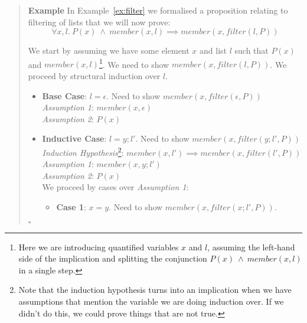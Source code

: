 \documentclass{tufte-handout}
\newcounter{example}
\newenvironment{example}
{\refstepcounter{example}\begin{quote}
\textbf{Example \arabic{example}}}
{

$\square$\end{quote}}
\begin{document}
\begin{example}\label{ex:filterproof}
  In Example~\ref{ex:filter} we formalised a proposition relating
  to filtering of lists that we will now prove:
  \[
    \forall x, l.~P(x) ~\land~ \mathit{member}(x, l)
    \implies
    \mathit{member}(x, \mathit{filter}(l, P))
  \]

  We start by assuming we have some element $x$ and list $l$ such
  that $P(x)$ and $\mathit{member}(x, l)$\footnote{Here we are
    introducing quantified variables $x$ and $l$, assuming the
    left-hand side of the implication and splitting the
    conjunction $P(x) ~\land~ \mathit{member}(x, l)$ in a single
    step.}. We need to show
  $\mathit{member}(x, \mathit{filter}(l, P))$. We proceed by
  structural induction over $l$.
  \begin{itemize}
  \item \textbf{Base Case}: $l = \epsilon$. Need to show $\mathit{member}(x, \mathit{filter}(\epsilon, P))$\\
    \textit{Assumption 1}: $\mathit{member}(x, \epsilon)$\\
    \textit{Assumption 2}: $P(x)$\\
  \item \textbf{Inductive Case}: $l = y; l'$. Need to show
    $\mathit{member}(x, \mathit{filter}(y; l', P))$\\
    \textit{Induction Hypothesis}\footnote{Note that the induction
      hypothesis turns into an implication when we have
      assumptions that mention the variable we are doing induction
      over. If we didn't do this, we could prove things that are
      not true. }:
    $\mathit{member}(x, l') \implies \mathit{member}(x,
    \mathit{filter}(l', P))$\\
    \textit{Assumption 1}: $\mathit{member}(x, y; l')$\\
    \textit{Assumption 2}: $P(x)$\\
    We proceed by cases over \textit{Assumption 1}:
    \begin{itemize}
      \item \textbf{Case 1}: $x = y$. Need to show
        $\mathit{member}(x, \mathit{filter}(x; l', P))$.

\end{itemize}
\end{itemize}
\end{example}
\end{document}
